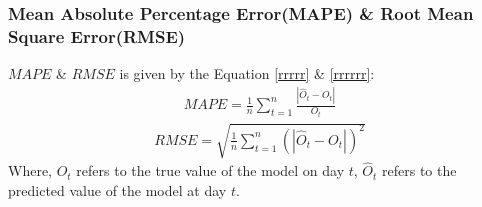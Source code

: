 \documentclass[12pt]{article}  %
\begin{document}
\subsubsection*{Mean Absolute Percentage Error(MAPE) \& Root Mean Square Error(RMSE)}
$MAPE$ \& $RMSE$ is given by the Equation \ref{rrrrr} \& \ref{rrrrrr}:
\begin{eqnarray}
	MAPE=\frac{1}{n}\sum_{t=1}^n\frac{|\hat{O}_t-O_t|}{O_t}\label{rrrrr}
\end{eqnarray}
\begin{eqnarray}
	RMSE=\sqrt{\frac{1}{n}\sum_{t=1}^n(|\hat{O}_t-O_t|)^2}\label{rrrrrr}
\end{eqnarray}
Where, $O_t$ refers to the true value of the model on day $t$, $\hat{O}_t$ refers to the predicted value of the model at day $t$.
\end{document}
